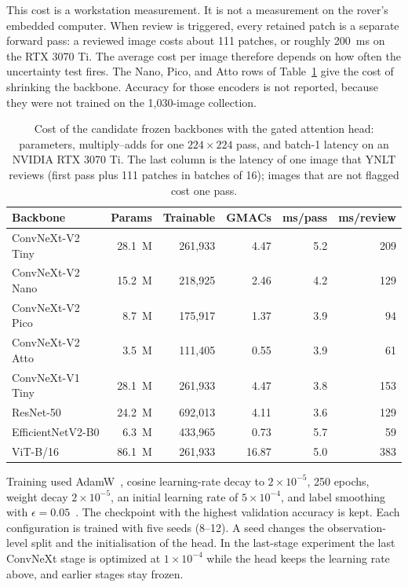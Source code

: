 \documentclass[final,3p,times,twocolumn]{elsarticle}
\begin{document}
This cost is a workstation measurement. It is not a measurement on the rover's embedded computer. When review is triggered, every retained patch is a separate forward pass: a reviewed image costs about 111 patches, or roughly 200~ms on the RTX 3070 Ti. The average cost per image therefore depends on how often the uncertainty test fires. The Nano, Pico, and Atto rows of Table~\ref{tab:cost} give the cost of shrinking the backbone. Accuracy for those encoders is not reported, because they were not trained on the 1{,}030-image collection.

\begin{table}[h]
    \centering
    \caption{Cost of the candidate frozen backbones with the gated attention head: parameters, multiply--adds for one $224\times 224$ pass, and batch-1 latency on an NVIDIA RTX 3070 Ti. The last column is the latency of one image that YNLT reviews (first pass plus 111 patches in batches of 16); images that are not flagged cost one pass.}
    \label{tab:cost}
    \renewcommand{\arraystretch}{1.2}
    \small
    \begin{tabular}{lrrrrr}
        \hline
        \textbf{Backbone} & \textbf{Params} & \textbf{Trainable} & \textbf{GMACs} & \textbf{ms/pass} & \textbf{ms/review} \\
        \hline
        ConvNeXt-V2 Tiny & 28.1~M & 261{,}933 & 4.47 & 5.2 & 209 \\
        ConvNeXt-V2 Nano & 15.2~M & 218{,}925 & 2.46 & 4.2 & 129 \\
        ConvNeXt-V2 Pico & 8.7~M & 175{,}917 & 1.37 & 3.9 & 94 \\
        ConvNeXt-V2 Atto & 3.5~M & 111{,}405 & 0.55 & 3.9 & 61 \\
        ConvNeXt-V1 Tiny & 28.1~M & 261{,}933 & 4.47 & 3.8 & 153 \\
        ResNet-50 & 24.2~M & 692{,}013 & 4.11 & 3.6 & 129 \\
        EfficientNetV2-B0 & 6.3~M & 433{,}965 & 0.73 & 5.7 & 59 \\
        ViT-B/16 & 86.1~M & 261{,}933 & 16.87 & 5.0 & 383 \\
        \hline
    \end{tabular}
\end{table}

Training used AdamW~\cite{loshchilov2019adamw}, cosine learning-rate decay to \(2\times 10^{-5}\), 250 epochs, weight decay \(2\times 10^{-5}\), an initial learning rate of \(5\times 10^{-4}\), and label smoothing with \(\epsilon=0.05\)~\cite{szegedy2016rethinking, Mulleretal2019}. The checkpoint with the highest validation accuracy is kept. Each configuration is trained with five seeds (8--12). A seed changes the observation-level split and the initialisation of the head. In the last-stage experiment the last ConvNeXt stage is optimized at \(1\times 10^{-4}\) while the head keeps the learning rate above, and earlier stages stay frozen.
\end{document}
